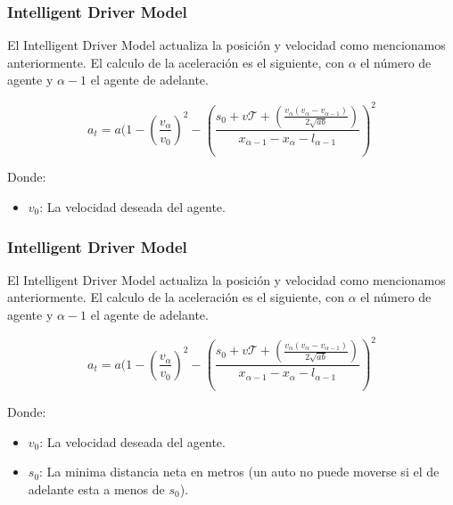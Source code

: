 \documentclass[10pt, compress]{beamer}
\begin{document}
\begin{frame}[fragile]

\frametitle{Intelligent Driver Model}
El Intelligent Driver Model actualiza la posici\'on y velocidad como mencionamos anteriormente. El calculo de la aceleraci\'on es el siguiente, con $\alpha$ el n\'umero de agente y $\alpha - 1$ el agente de adelante.

  \begin{equation*}
    a_t = a (1 - (\frac{v_\alpha}{v_0})^2 - (\frac{s_0 + v\mathcal{T} + (\frac{v_\alpha (v_\alpha - v_{\alpha-1})}{2\sqrt{ab}})}{x_{\alpha-1} - x_\alpha - l_{\alpha-1}})^2
  \end{equation*}

Donde:
\begin{itemize}
\item $v_0$: La velocidad deseada del agente.
\end{itemize}
\addtocounter{framenumber}{-1}
\end{frame}

\begin{frame}[fragile]

\frametitle{Intelligent Driver Model}
El Intelligent Driver Model actualiza la posici\'on y velocidad como mencionamos anteriormente. El calculo de la aceleraci\'on es el siguiente, con $\alpha$ el n\'umero de agente y $\alpha - 1$ el agente de adelante.

  \begin{equation*}
    a_t = a (1 - (\frac{v_\alpha}{v_0})^2 - (\frac{s_0 + v\mathcal{T} + (\frac{v_\alpha (v_\alpha - v_{\alpha-1})}{2\sqrt{ab}})}{x_{\alpha-1} - x_\alpha - l_{\alpha-1}})^2
  \end{equation*}

Donde:
\begin{itemize}
\item $v_0$: La velocidad deseada del agente.
\item $s_0$: La minima distancia neta en metros (un auto no puede moverse si el de adelante esta a menos de $s_0$).
\end{itemize}
\addtocounter{framenumber}{-1}
\end{frame}
\end{document}
